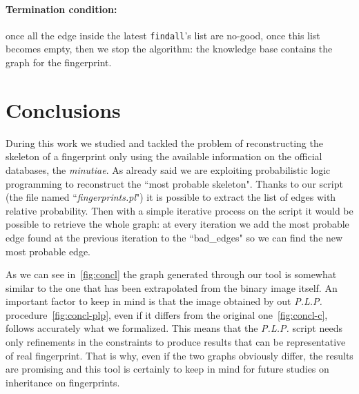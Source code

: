 \documentclass[8pt]{article}
\begin{document}
\paragraph{Termination condition:} once all the edge inside
the latest \texttt{findall}'s list are no-good, \ie once this list becomes empty,
then we stop the algorithm: the knowledge base contains the graph for the
fingerprint.

\section{Conclusions}
During this work we studied and tackled the problem of reconstructing the skeleton 
of a fingerprint only using the available information on the official databases, 
\ie the \emph{minutiae}.
As already said we are exploiting probabilistic logic programming to reconstruct the 
\textquotedblleft most probable skeleton".
Thanks to our script (the file named \textquotedblleft \textit{fingerprints.pl}") it 
is possible to extract the list of edges with relative probability. 
Then with a simple iterative process on the script it would be possible to retrieve 
the whole graph: at every iteration we add the most probable edge found at the previous 
iteration to the \textquotedblleft bad\_edges" so we can find the new most probable edge.

As we can see in~\cref{fig:concl} the graph generated through our tool is somewhat similar 
to the one that has been extrapolated from the binary image itself.
An important factor to keep in mind is that the image obtained by out \textit{P.L.P.} procedure~\cref{fig:concl-plp}, even if it differs from the original one~\cref{fig:concl-c}, follows accurately what we formalized.
This means that the \textit{P.L.P.} script needs only refinements in the constraints to produce results that can be representative of real fingerprint.
That is why, even if the two graphs obviously differ, the results are promising and this tool is certainly 
to keep in mind for future studies on inheritance on fingerprints.
\end{document}
